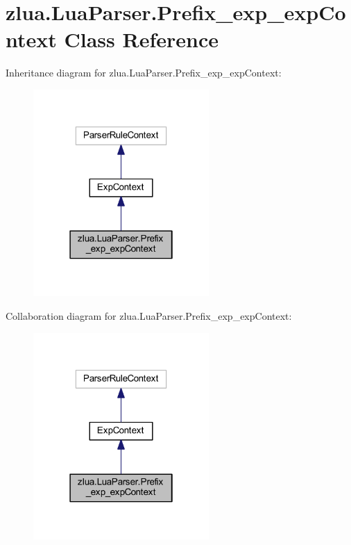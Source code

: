 \hypertarget{classzlua_1_1_lua_parser_1_1_prefix__exp__exp_context}{}\section{zlua.\+Lua\+Parser.\+Prefix\+\_\+exp\+\_\+exp\+Context Class Reference}
\label{classzlua_1_1_lua_parser_1_1_prefix__exp__exp_context}


Inheritance diagram for zlua.\+Lua\+Parser.\+Prefix\+\_\+exp\+\_\+exp\+Context\+:
\nopagebreak
\begin{figure}[H]
\begin{center}
\leavevmode
\includegraphics[width=190pt]{classzlua_1_1_lua_parser_1_1_prefix__exp__exp_context__inherit__graph}
\end{center}
\end{figure}


Collaboration diagram for zlua.\+Lua\+Parser.\+Prefix\+\_\+exp\+\_\+exp\+Context\+:
\nopagebreak
\begin{figure}[H]
\begin{center}
\leavevmode
\includegraphics[width=190pt]{classzlua_1_1_lua_parser_1_1_prefix__exp__exp_context__coll__graph}
\end{center}
\end{figure}
